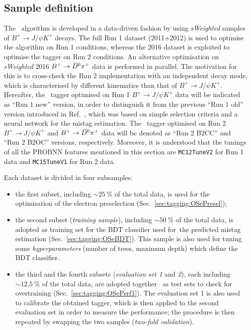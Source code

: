 
\subsection{Sample definition}

The \OSe~algorithm is developed in a data-driven fashion by using \emph{sWeighted} samples of $B^+\to J/\psi K^+$ decays. The full Run 1 dataset (2011+2012) is used to optimise the algorithm on Run 1 conditions, whereas the 2016 dataset is exploited to optimise the tagger on Run 2 conditions. An alternative optimisation on \emph{sWeighted} 2016 $B^+\rightarrow \kern 0.2em\overline{\kern -0.2em D}{}^0 \pi^+$ data is performed in parallel. The motivation for this is to cross-check the Run 2 implementation with an independent decay mode, which is characterised by different kinematics than that of $B^+\to J/\psi K^+$.
Hereafter, the \OSe~tagger optimised on Run 1 $B^+\to J/\psi K^+$ data will be indicated as ``Run 1 new'' version, in order to distinguish it from the previous ``Run 1 old'' version introduced in Ref.~\cite{LHCb-PAPER-2011-027}, which was based on simple selection criteria and a neural network for the mistag estimation.  
The \OSe~tagger optimised on Run 2 $B^+\to J/\psi K^+$ and $B^+\rightarrow \kern 0.2em\overline{\kern -0.2em D}{}^0 \pi^+$ data will be denoted as ``Run 2 B2CC'' and ``Run 2 B2OC'' versions, respectively.
Moreover, it is understood that the tunings of all the PROBNN features mentioned in this section are \texttt{MC12TuneV2} for Run 1 data and \texttt{MC15TuneV1} for Run 2 data.

Each dataset is divided in four subsamples:
\begin{itemize}[noitemsep,topsep=0pt]
  \item the first subset, including $\sim 25~\%$ of the total data, is used for the optimisation of the electron preselection (Sec.~\ref{sec:tagging:OSePresel});
    \item the second subset (\emph{training sample}), including $\sim 50~\%$ of the total data, is adopted as training set for the BDT classifier used for\
 the predicted mistag estimation (Sec.~\ref{sec:tagging:OSeBDT}). This sample is also used for tuning some \emph{hyperparameters} (number of trees, maximum depth) which define the BDT classifier.
 \item the third and the fourth subsets (\emph{evaluation set 1} and \emph{2}), each including $\sim 12.5~\%$ of the total data, are adopted together \
as test sets to check for overtraining (Sec.~\ref{sec:tagging:OSePerf1}). The evaluation set 1 is also used to calibrate the obtained tagger, which is then applied to the second evaluation set in order to measure the performance; the procedure is then repeated by swapping the two samples (\emph{two-fold validation}).
\end{itemize}

